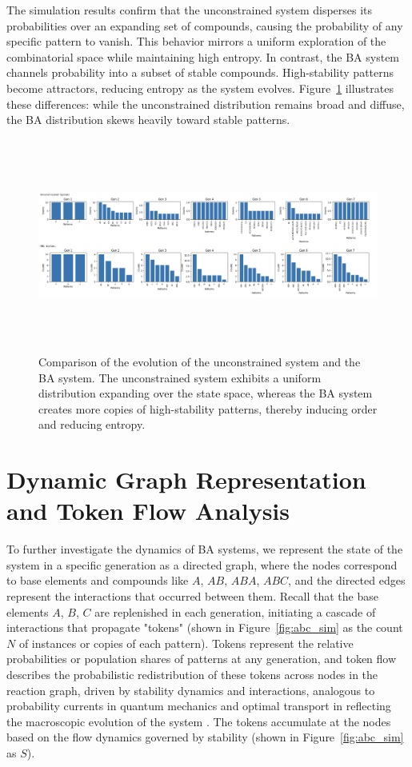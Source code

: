 \documentclass[entropy,article,submit,pdftex,moreauthors]{Definitions/mdpi}
\begin{document}
The simulation results confirm that the unconstrained system disperses its probabilities over an expanding set of compounds, causing the probability of any specific pattern to vanish. This behavior mirrors a uniform exploration of the combinatorial space while maintaining high entropy. In contrast, the BA system channels probability into a subset of stable compounds. High-stability patterns become attractors, reducing entropy as the system evolves. Figure~\ref{fig:simulation_results} illustrates these differences: while the unconstrained distribution remains broad and diffuse, the BA distribution skews heavily toward stable patterns.

\begin{figure}[h]
    \centering
    \includegraphics[width=1\textwidth,height=7cm]{monte-carlo-fits.png}
    \caption{Comparison of the evolution of the unconstrained system and the BA system. 
    The unconstrained system exhibits a uniform distribution expanding over the state space, 
    whereas the BA system creates more copies of high-stability patterns, 
    thereby inducing order and reducing entropy.}
    \label{fig:simulation_results}
\end{figure}

\section{Dynamic Graph Representation and Token Flow Analysis}

To further investigate the dynamics of BA systems, we represent the state of the system in a specific generation as a directed graph, where the nodes correspond to base elements and compounds like $A$, $AB$, $ABA$, $ABC$, and the directed edges represent the interactions that occurred between them. Recall that the base elements $A$, $B$, $C$ are replenished in each generation, initiating a cascade of interactions that propagate "tokens" (shown in Figure~\ref{fig:abc_sim} as the count $N$ of instances or copies of each pattern). Tokens represent the relative probabilities or population shares of patterns at any generation, and token flow describes the probabilistic redistribution of these tokens across nodes in the reaction graph, driven by stability dynamics and interactions, analogous to probability currents in quantum mechanics \cite{feynman1965quantum} and optimal transport in reflecting the macroscopic evolution of the system \cite{villani2008optimal}. The tokens accumulate at the nodes based on the flow dynamics governed by stability (shown in Figure~\ref{fig:abc_sim} as $S$).
\end{document}
